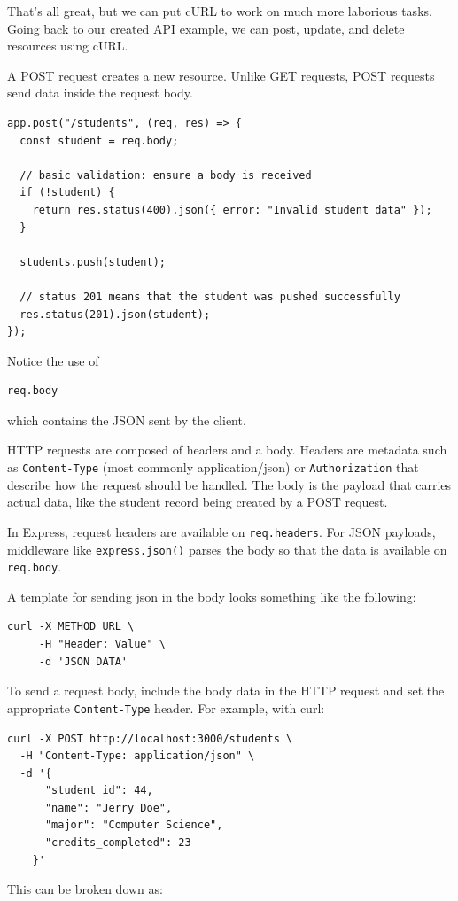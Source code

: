 That's all great, but we can put cURL to work on much more laborious tasks. Going back to our created API example, we can post, update, and delete resources using cURL.

A POST request creates a new resource. Unlike GET requests, POST
requests send data inside the request body.

\begin{verbatim}
app.post("/students", (req, res) => {
  const student = req.body;

  // basic validation: ensure a body is received
  if (!student) {
    return res.status(400).json({ error: "Invalid student data" });
  }

  students.push(student);

  // status 201 means that the student was pushed successfully
  res.status(201).json(student);
});
\end{verbatim}

Notice the use of

\begin{verbatim}
req.body
\end{verbatim}

which contains the JSON sent by the client.

HTTP requests are composed of headers and a body. Headers are metadata such as \texttt{Content-Type} (most commonly application/json) or \texttt{Authorization} that describe how the request should be handled. The body is the payload that carries actual data, like the student record being created by a POST request.

In Express, request headers are available on \texttt{req.headers}. For JSON payloads, middleware like \texttt{express.json()} parses the body so that the data is available on \texttt{req.body}.

A template for sending json in the body looks something like the following:
\begin{verbatim}
curl -X METHOD URL \
     -H "Header: Value" \
     -d 'JSON DATA'
\end{verbatim}

To send a request body, include the body data in the HTTP request and set the appropriate \texttt{Content-Type} header. For example, with curl:

\begin{verbatim}
curl -X POST http://localhost:3000/students \
  -H "Content-Type: application/json" \
  -d '{
      "student_id": 44,
      "name": "Jerry Doe",
      "major": "Computer Science",
      "credits_completed": 23
    }'
\end{verbatim}
This can be broken down as:

